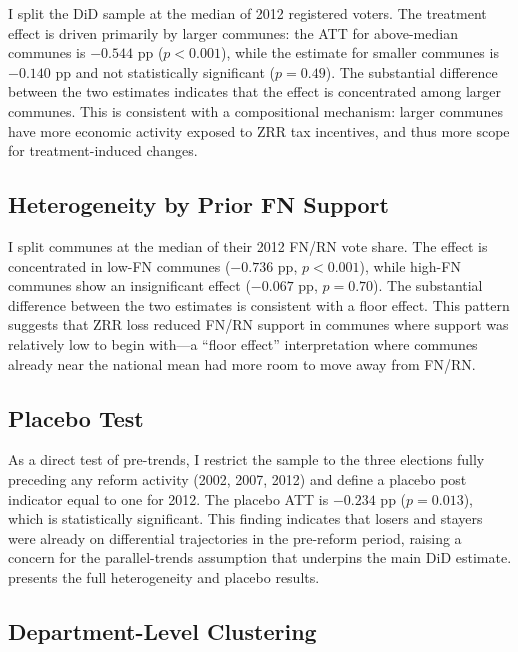 \documentclass[12pt]{article}
\begin{document}
I split the DiD sample at the median of 2012 registered voters. The treatment effect is driven primarily by larger communes: the ATT for above-median communes is $-0.544$ pp ($p < 0.001$), while the estimate for smaller communes is $-0.140$ pp and not statistically significant ($p = 0.49$). The substantial difference between the two estimates indicates that the effect is concentrated among larger communes. This is consistent with a compositional mechanism: larger communes have more economic activity exposed to ZRR tax incentives, and thus more scope for treatment-induced changes.

\subsection{Heterogeneity by Prior FN Support}

I split communes at the median of their 2012 FN/RN vote share. The effect is concentrated in low-FN communes ($-0.736$ pp, $p < 0.001$), while high-FN communes show an insignificant effect ($-0.067$ pp, $p = 0.70$). The substantial difference between the two estimates is consistent with a floor effect. This pattern suggests that ZRR loss reduced FN/RN support in communes where support was relatively low to begin with---a ``floor effect'' interpretation where communes already near the national mean had more room to move away from FN/RN.

\subsection{Placebo Test}

As a direct test of pre-trends, I restrict the sample to the three elections fully preceding any reform activity (2002, 2007, 2012) and define a placebo post indicator equal to one for 2012. The placebo ATT is $-0.234$ pp ($p = 0.013$), which is statistically significant. This finding indicates that losers and stayers were already on differential trajectories in the pre-reform period, raising a concern for the parallel-trends assumption that underpins the main DiD estimate.  presents the full heterogeneity and placebo results.



\subsection{Department-Level Clustering} \label{sec:epci_cluster}
\end{document}
